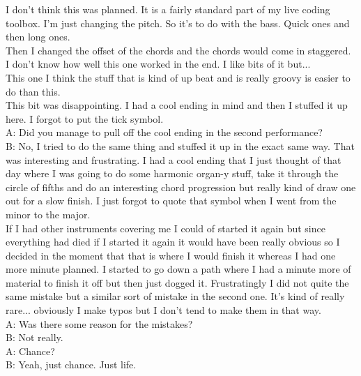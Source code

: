 I don't think this was planned. It is a fairly standard part of my live coding toolbox. I'm just changing the pitch. So it's to do with the bass. Quick ones and then long ones.\\

Then I changed the offset of the chords and the chords would come in staggered. I don't know how well this one worked in the end. I like bits of it but...\\

This one I think the stuff that is kind of up beat and is really groovy is easier to do than this.\\

This bit was disappointing. I had a cool ending in mind and then I stuffed it up here. I forgot to put the tick symbol.\\

A: Did you manage to pull off the cool ending in the second performance?\\

B: No, I tried to do the same thing and stuffed it up in the exact same way. That was interesting and frustrating. I had a cool ending that I just thought of that day where I was going to do some harmonic organ-y stuff, take it through the circle of fifths and do an interesting chord progression but really kind of draw one out for a slow finish. I just forgot to quote that symbol when I went from the minor to the major.\\

If I had other instruments covering me I could of started it again but since everything had died if I started it again it would have been really obvious so I decided in the moment that that is where I would finish it whereas I had one more minute planned. I started to go down a path where I had a minute more of material to finish it off but then just dogged it. Frustratingly I did not quite the same mistake but a similar sort of mistake in the second one. It's kind of really rare... obviously I make typos but I don't tend to make them in that way.\\

A: Was there some reason for the mistakes?\\

B: Not really.\\

A: Chance?\\

B: Yeah, just chance. Just life.\\

